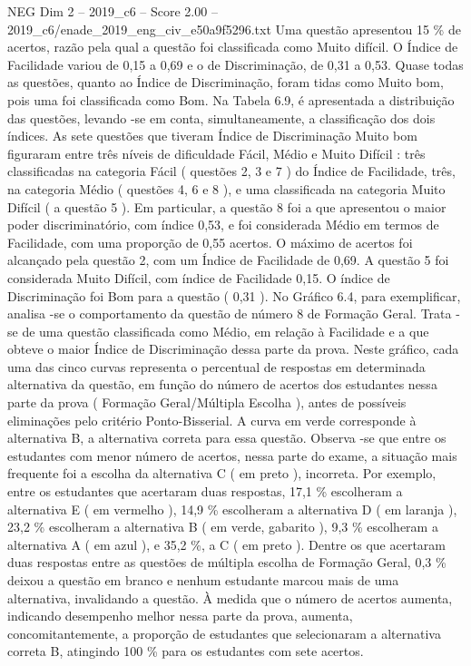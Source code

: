 \begin{textsample}{NEG Dim 2 – 2019\_c6 – Score 2.00 – 2019\_c6/enade\_2019\_eng\_civ\_e50a9f5296.txt}
Uma questão apresentou 15 \% de acertos, razão pela qual a questão foi classificada como Muito difícil.
O Índice de Facilidade variou de 0,15 a 0,69 e o de Discriminação, de 0,31 a 0,53.
Quase todas as questões, quanto ao Índice de Discriminação, foram tidas como Muito bom, pois uma foi classificada como Bom.
Na Tabela 6.9, é apresentada a distribuição das questões, levando -se em conta, simultaneamente, a classificação dos dois índices.
As sete questões que tiveram Índice de Discriminação Muito bom figuraram entre três níveis de dificuldade Fácil, Médio e Muito Difícil : três classificadas na categoria Fácil ( questões 2, 3 e 7 ) do Índice de Facilidade, três, na categoria Médio ( questões 4, 6 e 8 ), e uma classificada na categoria Muito Difícil ( a questão 5 ).
Em particular, a questão 8 foi a que apresentou o maior poder discriminatório, com índice 0,53, e foi considerada Médio em termos de Facilidade, com uma proporção de 0,55 acertos.
O máximo de acertos foi alcançado pela questão 2, com um Índice de Facilidade de 0,69.
A questão 5 foi considerada Muito Difícil, com índice de Facilidade 0,15.
O índice de Discriminação foi Bom para a questão ( 0,31 ).
No Gráfico 6.4, para exemplificar, analisa -se o comportamento da questão de número 8 de Formação Geral.
Trata -se de uma questão classificada como Médio, em relação à Facilidade e a que obteve o maior Índice de Discriminação dessa parte da prova.
Neste gráfico, cada uma das cinco curvas representa o percentual de respostas em determinada alternativa da questão, em função do número de acertos dos estudantes nessa parte da prova ( Formação Geral/Múltipla Escolha ), antes de possíveis eliminações pelo critério Ponto-Bisserial.
A curva em verde corresponde à alternativa B, a alternativa correta para essa questão.
Observa -se que entre os estudantes com menor número de acertos, nessa parte do exame, a situação mais frequente foi a escolha da alternativa C ( em preto ), incorreta.
Por exemplo, entre os estudantes que acertaram duas respostas, 17,1 \% escolheram a alternativa E ( em vermelho ), 14,9 \% escolheram a alternativa D ( em laranja ), 23,2 \% escolheram a alternativa B ( em verde, gabarito ), 9,3 \% escolheram a alternativa A ( em azul ), e 35,2 \%, a C ( em preto ).
Dentre os que acertaram duas respostas entre as questões de múltipla escolha de Formação Geral, 0,3 \% deixou a questão em branco e nenhum estudante marcou mais de uma alternativa, invalidando a questão.
À medida que o número de acertos aumenta, indicando desempenho melhor nessa parte da prova, aumenta, concomitantemente, a proporção de estudantes que selecionaram a alternativa correta B, atingindo 100 \% para os estudantes com sete acertos.

\end{textsample}
